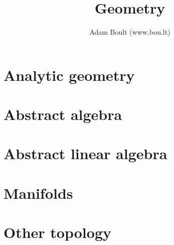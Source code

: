 \documentclass[oneside]{book}
\begin{document}
\author{Adam Boult (www.bou.lt)}
\title{Geometry}
\maketitle

\setcounter{tocdepth}{0}
\tableofcontents



\part{Analytic geometry}







\part{Abstract algebra}




\part{Abstract linear algebra}










\part{Manifolds}







\part{Other topology}




\end{document}
